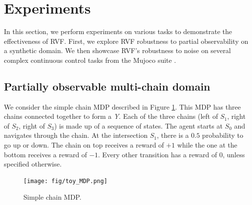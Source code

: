 \section{Experiments}
In this section, we perform experiments on various tasks to demonstrate the effectiveness of RVF.
First, we explore RVF robustness to partial observability on a synthetic domain. We then showcase RVF's robustness to noise on several complex continuous control tasks from the Mujoco suite \citep{todorov2012mujoco}. \subsection{Partially observable multi-chain domain}
We consider the simple chain MDP described in Figure \ref{fig:toy MDP}. This MDP has three chains connected together to form a \emph{Y}. Each of the three chains (left of $S_1$, right of $S_2$, right of $S_3$) is made up of a sequence of states. The agent starts at $S_0$ and navigates through the chain. At the intersection $S_1$, there is a $0.5$ probability to go up or down. The chain on top receives a reward of $+1$ while the one at the bottom receives a reward of $-1$. Every other transition has a reward of $0$, unless specified otherwise.
\begin{figure}[h]
	\centering
    \texttt{[image: fig/toy\_MDP.png]}
    \caption[Y-chain]{Simple chain MDP.}
    \label{fig:toy MDP}
\end{figure}


